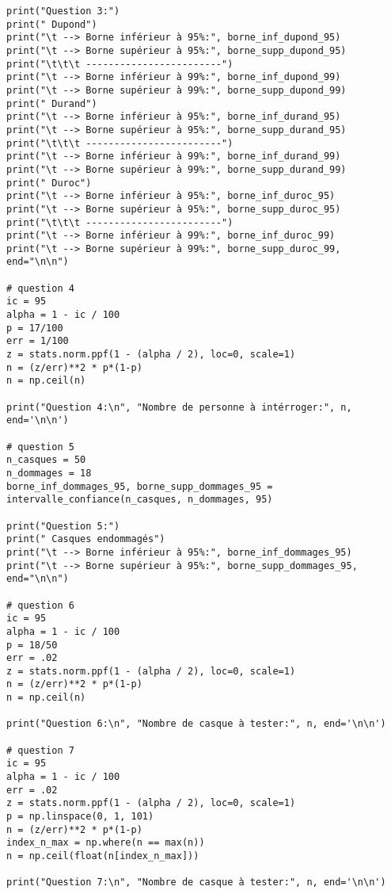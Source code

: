 \begin{lstlisting}[style=myPython, caption=Code Python complet TP3, frame=lines]
print("Question 3:")
print(" Dupond")
print("\t --> Borne inférieur à 95%:", borne_inf_dupond_95)
print("\t --> Borne supérieur à 95%:", borne_supp_dupond_95)
print("\t\t\t ------------------------")
print("\t --> Borne inférieur à 99%:", borne_inf_dupond_99)
print("\t --> Borne supérieur à 99%:", borne_supp_dupond_99)
print(" Durand")
print("\t --> Borne inférieur à 95%:", borne_inf_durand_95)
print("\t --> Borne supérieur à 95%:", borne_supp_durand_95)
print("\t\t\t ------------------------")
print("\t --> Borne inférieur à 99%:", borne_inf_durand_99)
print("\t --> Borne supérieur à 99%:", borne_supp_durand_99)
print(" Duroc")
print("\t --> Borne inférieur à 95%:", borne_inf_duroc_95)
print("\t --> Borne supérieur à 95%:", borne_supp_duroc_95)
print("\t\t\t ------------------------")
print("\t --> Borne inférieur à 99%:", borne_inf_duroc_99)
print("\t --> Borne supérieur à 99%:", borne_supp_duroc_99, end="\n\n")

# question 4
ic = 95
alpha = 1 - ic / 100
p = 17/100
err = 1/100
z = stats.norm.ppf(1 - (alpha / 2), loc=0, scale=1)
n = (z/err)**2 * p*(1-p)
n = np.ceil(n)

print("Question 4:\n", "Nombre de personne à intérroger:", n, end='\n\n')

# question 5
n_casques = 50
n_dommages = 18
borne_inf_dommages_95, borne_supp_dommages_95 = intervalle_confiance(n_casques, n_dommages, 95)

print("Question 5:")
print(" Casques endommagés")
print("\t --> Borne inférieur à 95%:", borne_inf_dommages_95)
print("\t --> Borne supérieur à 95%:", borne_supp_dommages_95, end="\n\n")

# question 6
ic = 95
alpha = 1 - ic / 100
p = 18/50
err = .02
z = stats.norm.ppf(1 - (alpha / 2), loc=0, scale=1)
n = (z/err)**2 * p*(1-p)
n = np.ceil(n)

print("Question 6:\n", "Nombre de casque à tester:", n, end='\n\n')

# question 7
ic = 95
alpha = 1 - ic / 100
err = .02
z = stats.norm.ppf(1 - (alpha / 2), loc=0, scale=1)
p = np.linspace(0, 1, 101)
n = (z/err)**2 * p*(1-p)
index_n_max = np.where(n == max(n))
n = np.ceil(float(n[index_n_max]))

print("Question 7:\n", "Nombre de casque à tester:", n, end='\n\n')    
\end{lstlisting}
